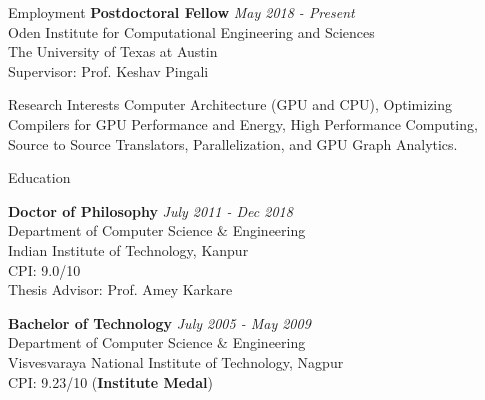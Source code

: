 \documentclass{resume} %
\begin{document}
\begin{rSection}{Employment}
{\bf Postdoctoral Fellow } \hfill {\em May 2018 - Present} \\ 
Oden Institute for Computational Engineering and Sciences \\
The University of Texas at Austin \\
Supervisor: Prof. Keshav Pingali
\end{rSection}

\begin{rSection}{Research Interests}
Computer Architecture (GPU and CPU), Optimizing Compilers for GPU Performance and Energy, High Performance Computing, Source to Source Translators, Parallelization, and  GPU Graph Analytics.
\end{rSection}


\begin{rSection}{Education}



{\bf Doctor of Philosophy} \hfill {\em July 2011 - Dec 2018} \\ 
Department of Computer Science \& Engineering \\
Indian Institute of Technology, Kanpur \\
CPI: 9.0/10 \\
Thesis Advisor: Prof. Amey Karkare


{\bf Bachelor of Technology} \hfill {\em July 2005 - May 2009}  \\
Department of Computer Science \& Engineering \\
Visvesvaraya National Institute of Technology, Nagpur \\
CPI: 9.23/10 (\textbf{Institute Medal})


\end{rSection}
\end{document}
